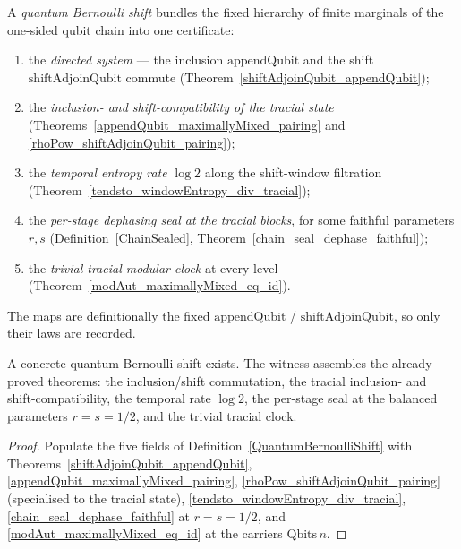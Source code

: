 \begin{definition}\label{QuantumBernoulliShift}
  \leanok
  A \emph{quantum Bernoulli shift} bundles the fixed hierarchy of finite marginals of the one-sided
  qubit chain into one certificate:
  \begin{enumerate}
    \item the \emph{directed system} --- the inclusion \(\mathrm{appendQubit}\) and the shift
      \(\mathrm{shiftAdjoinQubit}\) commute (Theorem~\ref{shiftAdjoinQubit_appendQubit});
    \item the \emph{inclusion- and shift-compatibility of the tracial state}
      (Theorems~\ref{appendQubit_maximallyMixed_pairing} and
      \ref{rhoPow_shiftAdjoinQubit_pairing});
    \item the \emph{temporal entropy rate} \(\log 2\) along the shift-window filtration
      (Theorem~\ref{tendsto_windowEntropy_div_tracial});
    \item the \emph{per-stage dephasing seal at the tracial blocks}, for some faithful parameters
      \(r,s\) (Definition~\ref{ChainSealed}, Theorem~\ref{chain_seal_dephase_faithful});
    \item the \emph{trivial tracial modular clock} at every level
      (Theorem~\ref{modAut_maximallyMixed_eq_id}).
  \end{enumerate}
  The maps are definitionally the fixed \(\mathrm{appendQubit}\) / \(\mathrm{shiftAdjoinQubit}\), so
  only their laws are recorded.
\end{definition}

\begin{theorem}\label{quantumBernoulliShift_exists}
  \leanok
  A concrete quantum Bernoulli shift exists. The witness assembles the already-proved theorems: the
  inclusion/shift commutation, the tracial inclusion- and shift-compatibility, the temporal rate
  \(\log 2\), the per-stage seal at the balanced parameters \(r=s=1/2\), and the trivial tracial
  clock.
\end{theorem}
\begin{proof}\leanok
  Populate the five fields of Definition~\ref{QuantumBernoulliShift} with
  Theorems~\ref{shiftAdjoinQubit_appendQubit}, \ref{appendQubit_maximallyMixed_pairing},
  \ref{rhoPow_shiftAdjoinQubit_pairing} (specialised to the tracial state),
  \ref{tendsto_windowEntropy_div_tracial}, \ref{chain_seal_dephase_faithful} at \(r=s=1/2\), and
  \ref{modAut_maximallyMixed_eq_id} at the carriers \(\mathrm{Qbits}\,n\).
\end{proof}
